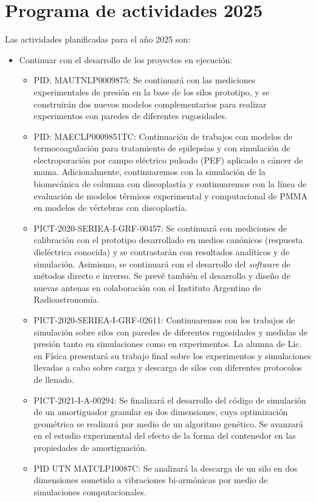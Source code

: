 \documentclass[a4paper,11pt,twoside,final,titlepage,onecolumn,openright]{report}
\begin{document}
\chapter{Programa de actividades 2025}

Las actividades planificadas para el año 2025 son:

\begin{itemize}
\item Continuar con el desarrollo de los proyectos en ejecución:
    \begin{itemize}
\item PID: MAUTNLP0009875: Se continuará con las mediciones experimentales de presión en la base de los silos prototipo, y se construirán dos nuevos modelos complementarios para realizar experimentos con paredes de diferentes rugosidades. 
 \item PID: MAECLP0009851TC: Continuación de trabajos con modelos de termocoagulación para tratamiento de epilepsias y con simulación de electroporación por campo eléctrico pulsado (PEF) aplicado a cáncer de mama. Adicionalmente, continuaremos con la simulación de la biomecánica de columna con discoplastía y continuaremos con la línea de evaluación  de modelos térmicos experimental y computacional de PMMA en modelos de vértebras con discoplastía.
\item PICT-2020-SERIEA-I-GRF-00457: Se continuará con mediciones de calibración con el prototipo desarrollado en medios canónicos (respuesta dieléctrica conocida) y se contrastarán con resultados analíticos y de simulación. Asimismo, se continuará con el desarrollo del \textit{software} de métodos directo e inverso. Se prevé también el desarrollo y diseño de nuevas antenas en colaboración con el Instituto Argentino de Radioastronomía.
\item PICT-2020-SERIEA-I-GRF-02611: Continuaremos con los trabajos de simulación sobre silos con paredes de diferentes rugosidades y medidas de presión tanto en simulaciones como en experimentos. La alumna de Lic. en Física presentará su trabajo final sobre los experimentos y simulaciones llevadas a cabo sobre carga y descarga de silos con diferentes protocolos de llenado.
\item PICT-2021-I-A-00294: Se finalizará el desarrollo del código de simulación de un amortiguador granular en dos dimensiones, cuya optimización geométrica se realizará por medio de un algoritmo genético. Se avanzará en el estudio experimental del efecto de la forma del contenedor en las propiedades de amortiguación.
\item PID UTN MATCLP10087C: Se analizará la descarga de un silo en dos dimensiones sometido a vibraciones bi-armónicas por medio de simulaciones computacionales.

\end{itemize}
\end{itemize}
\end{document}
